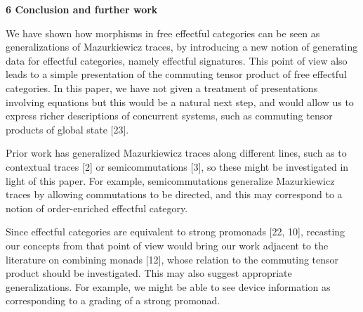  
 


 
\par\medskip\noindent\textbf{6 Conclusion and further work}\par
 
 
We have shown how morphisms in free effectful categories can be seen as generalizations of Mazurkiewicz traces, by introducing a new notion of generating data for effectful categories, namely effectful signatures. This point of view also leads to a simple presentation of the commuting tensor product of free effectful categories. In this paper, we have not given a treatment of presentations involving equations but this would be a natural next step, and would allow us to express richer descriptions of concurrent systems, such as commuting tensor products of global state [23].\par
 
 
 
Prior work has generalized Mazurkiewicz traces along different lines, such as to contextual traces [2] or semicommutations [3], so these might be investigated in light of this paper. For example, semicommutations generalize Mazurkiewicz traces by allowing commutations to be directed, and this may correspond to a notion of order-enriched effectful category.\par
 
 
 
Since effectful categories are equivalent to strong promonads [22, 10], recasting our concepts from that point of view would bring our work adjacent to the literature on combining monads [12], whose relation to the commuting tensor product should be investigated. This may also suggest appropriate generalizations. For example, we might be able to see device information as corresponding to a grading of a strong promonad.\par
 
 
 
